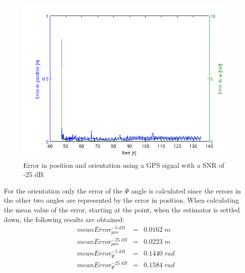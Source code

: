 \begin{figure}[hb]
\centering
\includegraphics[width=1\textwidth]{pictures/2_2_SNR25_errors_GPS.png}
\caption{Error in position and orientation 	using a GPS signal with a SNR of -25 dB.}
\label{error_25snr}
\end{figure}
For the orientation only the error of the $\Psi$ angle is calculated since the errors in the other two angles are represented by the error in position. When calculating the mean value of the error, starting at the point, when the estimator is settled down, the following results are obtained:
\begin{eqnarray}
meanError_{pos}^{-5\;dB}&=&0.0162\;m \\ meanError_{pos}^{-25\;dB}&=&0.0223\;m \\ meanError_{\Psi}^{-5\;dB}&=& 0.1440\;rad\\ meanError_{\Psi}^{-25\;dB}&=& 0.1584 \;rad
\end{eqnarray}


